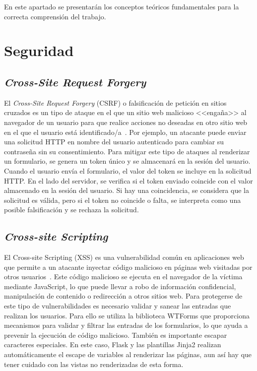 
En este apartado se presentarán los conceptos teóricos fundamentales para la correcta comprensión del trabajo.

\section{Seguridad}
\subsection{\textit{Cross-Site Request Forgery}}
El \textit{Cross-Site Request Forgery} (CSRF) o  falsificación de petición en sitios cruzados es un tipo de ataque en el que un sitio web malicioso <<engaña>> al navegador de un usuario para que realice acciones no deseadas en otro sitio web en el que el usuario está identificado/a~\cite{wiki:csrf}.
Por ejemplo, un atacante puede enviar una solicitud HTTP en nombre del usuario autenticado para cambiar su contraseña sin su consentimiento.
Para mitigar este tipo de ataques al renderizar un formulario, se genera un token único y se almacenará en la sesión del usuario.
Cuando el usuario envía el formulario, el valor del token se incluye en la solicitud HTTP. 
En el lado del servidor, se verifica si el token enviado coincide con el valor almacenado en la sesión del usuario. 
Si hay una coincidencia, se considera que la solicitud es válida, pero si el token no coincide o falta, se interpreta como una posible falsificación y se rechaza la solicitud.

\subsection{\textit{Cross-site Scripting}}
El Cross-site Scripting (XSS) es una vulnerabilidad común en aplicaciones web que permite a un atacante inyectar código malicioso en páginas web visitadas por otros usuarios~\cite{wiki:xss}.
Este código malicioso se ejecuta en el navegador de la víctima mediante JavaScript, lo que puede llevar a robo de información confidencial, manipulación de contenido o redirección a otros sitios web.
Para protegerse de este tipo de vulnerabilidades es necesario validar y sanear las entradas que realizan los usuarios. 
Para ello se utiliza la biblioteca WTForms que proporciona mecanismos para validar y filtrar las entradas de los formularios, lo que ayuda a prevenir la ejecución de código malicioso.
También es importante escapar caracteres especiales.
En este caso, Flask y las plantillas Jinja2 realizan automáticamente el escape de variables al renderizar las páginas, aun así hay que tener cuidado con las vistas no renderizadas de esta forma.

